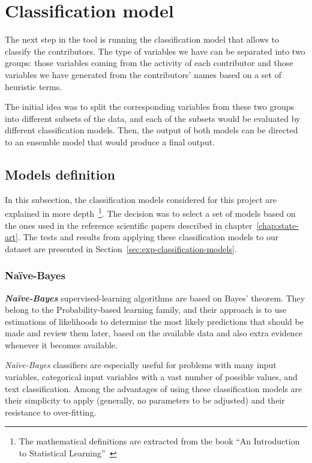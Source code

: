 \documentclass[a4paper, 12pt]{book}
\begin{document}
\section{Classification model} 
\label{sec:classification-model}

The next step in the tool is running the classification model that allows to classify the contributors. The type of variables we have can be separated into two groups: those variables coming from the activity of each contributor and those variables we have generated from the contributors' names based on a set of heuristic terms.

The initial idea was to split the corresponding variables from these two groups into different subsets of the data, and each of the subsets would be evaluated by different classification models. Then, the output of both models can be directed to an ensemble model that would produce a final output.

\subsection{Models definition}
\label{ssec:models-definition}

In this subsection, the classification models considered for this project are explained in more depth~\footnote{The mathematical definitions are extracted from the book ``An Introduction to Statistical Learning''~\cite{introstatlearning}}. The decision was to select a set of models based on the ones used in the reference scientific papers described in chapter~\ref{chap:state-art}. The tests and results from applying these classification models to our dataset are presented in Section~\ref{sec:exp-classification-models}.

\subsubsection{Naïve-Bayes}
\label{sssec:gaussian-naive-bayes}

\textit{\textbf{Naïve-Bayes}} supervised-learning algorithms are based on Bayes’ theorem. They belong to the Probability-based learning family, and their approach is to use estimations of likelihoods to determine the most likely predictions that should be made and review them later, based on the available data and also extra evidence whenever it becomes available.

\textit{Naïve-Bayes} classifiers are especially useful for problems with many input variables, categorical input variables with a vast number of possible values, and text classification. Among the advantages of using these classification models are their simplicity to apply (generally, no parameters to be adjusted) and their resistance to over-fitting.
\end{document}
